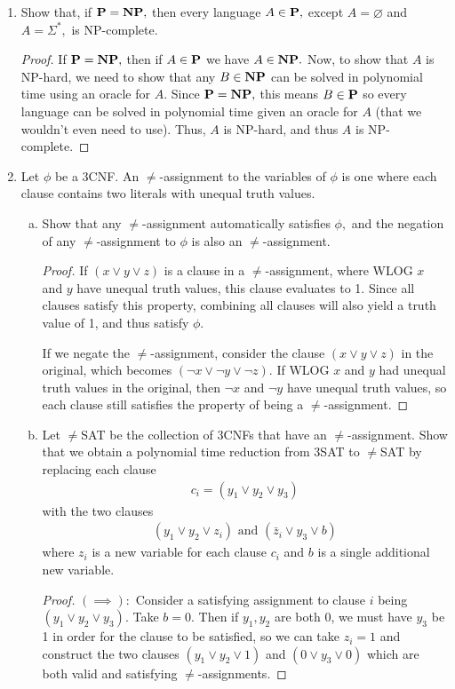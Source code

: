 \documentclass{article}
\begin{document}
\begin{enumerate}
		\newpage
	\item Show that, if $\bf{P}=\bf{NP},$ then every language $A\in\bf{P},$ except $A=\varnothing$ and $A=\Sigma^*,$ is NP-complete.
		\begin{proof}
			If $\bf{P}=\bf{NP},$ then if $A\in\bf{P}$ we have $A\in\bf{NP}.$ Now, to show that $A$ is NP-hard, we need to show that any $B\in\bf{NP}$ can be solved in polynomial time using an oracle for $A.$ Since $\bf{P}=\bf{NP},$ this means $B\in \bf{P}$ so every language can be solved in polynomial time given an oracle for $A$ (that we wouldn't even need to use). Thus, $A$ is NP-hard, and thus $A$ is NP-complete. 
		\end{proof}

		\newpage
	\item Let $\phi$ be a 3CNF. An $\neq$-assignment to the variables of $\phi$ is one where each clause contains two literals with unequal truth values.
		\begin{enumerate}[(a)]
			\item Show that any $\neq$-assignment automatically satisfies $\phi,$ and the negation of any $\neq$-assignment to $\phi$ is also an $\neq$-assignment.
				\begin{proof}
					If $(x\vee y\vee z)$ is a clause in a $\neq$-assignment, where WLOG $x$ and $y$ have unequal truth values, this clause evaluates to 1. Since all clauses satisfy this property, combining all clauses will also yield a truth value of 1, and thus satisfy $\phi.$

					If we negate the $\neq$-assignment, consider the clause $(x\vee y\vee z)$ in the original, which becomes $(\neg x\vee\neg y\vee\neg z).$ If WLOG $x$ and $y$ had unequal truth values in the original, then $\neg x$ and $\neg y$ have unequal truth values, so each clause still satisfies the property of being a $\neq$-assignment.
				\end{proof}

			\item Let $\neq$SAT be the collection of 3CNFs that have an $\neq$-assignment. Show that we obtain a polynomial time reduction from 3SAT to $\neq$SAT by replacing each clause
				\begin{align*}
					c_i=\left( y_1\vee y_2\vee y_3 \right)
				\end{align*}
				with the two clauses
				\begin{align*}
					\left( y_1\vee y_2\vee z_i \right)\text{ and } \left(\bar z_i\vee y_3\vee b\right)
				\end{align*}
				where $z_i$ is a new variable for each clause $c_i$ and $b$ is a single additional new variable.
				\begin{proof}
					$(\implies):$ Consider a satisfying assignment to clause $i$ being $(y_1\vee y_2\vee y_3).$ Take $b=0.$ Then if $y_1, y_2$ are both 0, we must have $y_3$ be 1 in order for the clause to be satisfied, so we can take $z_i=1$ and construct the two clauses $(y_1\vee y_2\vee 1)$ and $(0\vee y_3\vee 0)$ which are both valid and satisfying $\neq$-assignments. 
					

\end{proof}
\end{enumerate}
\end{enumerate}
\end{document}
